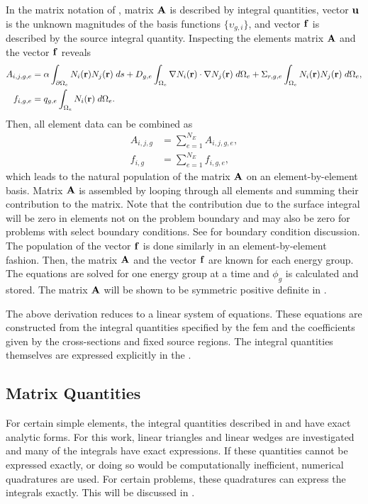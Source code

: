     In the matrix notation of , matrix $\mathbf{A}$ is 
    described by integral quantities, vector $\mathbf{u}$ is the unknown magnitudes of
    the basis functions $\{\upsilon_{g,i}\}$, and vector $\mathbf{f}$ is described by
    the source integral quantity. Inspecting the elements matrix $\mathbf{A}$ and the
    vector $\mathbf{f}$ reveals 
    \begin{align}
      \label{eq:matrix_population}
      A_{i,j,g,e} &= \alpha \int_{\partial \Omega_e} N_i(\mathbf{r}) 
        N_j(\mathbf{r}) \; ds + D_{g,e} 
        \int_{\Omega_e} \mathbf{\nabla} N_i(\mathbf{r}) \cdot \mathbf{\nabla} N_j(\mathbf{r}) \;
        d\Omega_e + \Sigma_{r,g,e} \int_{\Omega_e} N_i(\mathbf{r}) N_j(\mathbf{r})
        \; d\Omega_e, \\
      \label{eq:vector_population}
      f_{i,g,e} &= q_{g,e} \int_{\Omega_e} N_i(\mathbf{r}) \;d\Omega_e.
    \end{align}
    Then, all element data can be combined as
    \begin{align}
      A_{i,j,g} &= \sum_{e=1}^{N_E} A_{i,j,g,e}, \\
      f_{i,g} &=  \sum_{e=1}^{N_E} f_{i,g,e},
    \end{align}
    which leads to the natural population of the matrix $\mathbf{A}$ on an 
    element-by-element basis. Matrix $\mathbf{A}$ is assembled by looping
    through all elements and summing their contribution to the matrix. 
    Note that the contribution due to the surface integral will be zero in 
    elements not on the problem boundary and may also be zero for problems with
    select boundary conditions. See  for boundary
    condition discussion. The population of the vector $\mathbf{f}$ is done similarly
    in an element-by-element fashion. Then, the matrix $\mathbf{A}$ and the vector 
    $\mathbf{f}$ are known for each energy group. The equations are solved for one
    energy group at a time and $\phi_g$ is calculated and stored. The matrix
    $\mathbf{A}$ will be shown to be symmetric positive definite in
    .
    
    The above derivation reduces to a linear system of
    equations. These equations are constructed from the integral quantities 
    specified by the \gls{fem} and the coefficients given by the cross-sections 
    and fixed source regions. The integral quantities themselves are expressed 
    explicitly in the .
    
  \subsection{Matrix Quantities}
    \label{sec:matrix_quantities}
    For certain simple elements, the integral quantities described in 
     and  have exact 
    analytic forms. For this work, linear triangles and linear wedges
    are investigated and many of the integrals have exact expressions. If these 
    quantities cannot be expressed exactly, or doing so would be computationally
    inefficient, numerical quadratures are used. For certain problems, these 
    quadratures can express the integrals exactly. This will be discussed in 
    .

